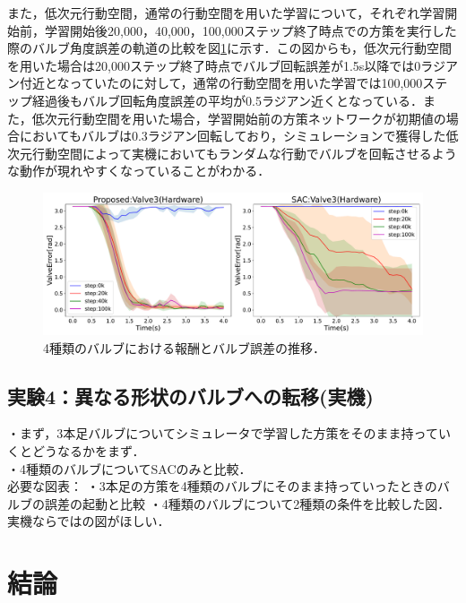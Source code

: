 \documentclass[dvipdfmx]{ampbt_nomag}
\begin{document}
また，低次元行動空間，通常の行動空間を用いた学習について，それぞれ学習開始前，学習開始後20,000，40,000，100,000ステップ終了時点での方策を実行した際のバルブ角度誤差の軌道の比較を図\ref{ValveTrajectory_Valve3_Hardware}に示す．この図からも，低次元行動空間を用いた場合は20,000ステップ終了時点でバルブ回転誤差が1.5s以降では0ラジアン付近となっていたのに対して，通常の行動空間を用いた学習では100,000ステップ経過後もバルブ回転角度誤差の平均が0.5ラジアン近くとなっている．また，低次元行動空間を用いた場合，学習開始前の方策ネットワークが初期値の場合においてもバルブは0.3ラジアン回転しており，シミュレーションで獲得した低次元行動空間によって実機においてもランダムな行動でバルブを回転させるような動作が現れやすくなっていることがわかる．


\begin{figure}[htbp]
  \centering
  \includegraphics[width=16cm]
       {asset/img/ValveTrajectory_HardwareTurn180Valve3.pdf}
  \caption{4種類のバルブにおける報酬とバルブ誤差の推移．}
  \label{ValveTrajectory_Valve3_Hardware}
\end{figure}


\subsection{実験4：異なる形状のバルブへの転移(実機)}
・まず，3本足バルブについてシミュレータで学習した方策をそのまま持っていくとどうなるかをまず．\\
・4種類のバルブについてSACのみと比較．\\
必要な図表：
・3本足の方策を4種類のバルブにそのまま持っていったときのバルブの誤差の起動と比較
・4種類のバルブについて2種類の条件を比較した図．\\
実機ならではの図がほしい．

\clearpage
\section{結論}\label{sec-conclusion}
\end{document}
